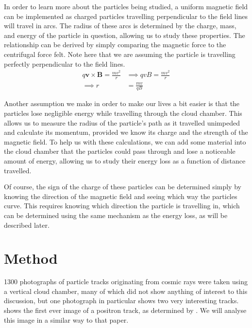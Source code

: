 \documentclass[11pt]{article}
\newcommand{\mb}[1]{\mathbf{#1}}
\numberwithin{equation}{section}
\numberwithin{figure}{section}
\numberwithin{table}{section}
\begin{document}
In order to learn more about the particles being studied, a uniform magnetic field can be implemented as charged particles travelling perpendicular to the field lines will travel in arcs. The radius of these arcs is determined by the charge, mass, and energy of the particle in question, allowing us to study these properties. The relationship can be derived by simply comparing the magnetic force to the centrifugal force felt. Note here that we are assuming the particle is travelling perfectly perpendicular to the field lines.
\begin{align}
    q \mb{v}\times\mb{B}=\frac{mv^2}{r} &\implies qvB=\frac{mv^2}{r}\nonumber\\
    \implies r&=\frac{mv}{qB} \label{eqn:radius}
\end{align}

Another assumption we make in order to make our lives a bit easier is that the particles lose negligible energy while travelling through the cloud chamber. This allows us to measure the radius of the particle's path as it travelled unimpeded and calculate its momentum, provided we know its charge and the strength of the magnetic field. To help us with these calculations, we can add some material into the cloud chamber that the particles could pass through and lose a noticeable amount of energy, allowing us to study their energy loss as a function of distance travelled. 

Of course, the sign of the charge of these particles can be determined simply by knowing the direction of the magnetic field and seeing which way the particles curve. This requires knowing which direction the particle is travelling in, which can be determined using the same mechanism as the energy loss, as will be described later. 

\section{Method}\label{sec:Method}
1300 photographs of particle tracks originating from cosmic rays were taken using a vertical cloud chamber, many of which did not show anything of interest to this discussion, but one photograph in particular shows two very interesting tracks.  shows the first ever image of a positron track, as determined by \cite{Pos_Electron}. We will analyse this image in a similar way to that paper.
\end{document}
